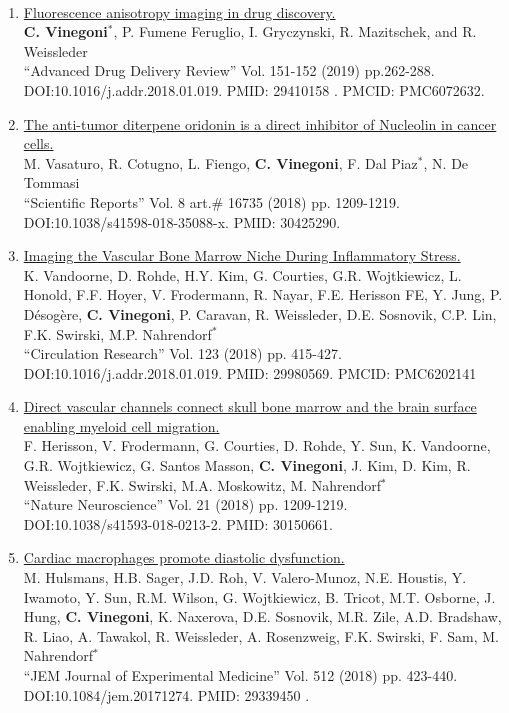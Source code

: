 \documentclass{resume}
\begin{document}
\begin{category}{~~}
\begin{enumerate}
\item \href{https://tinyurl.com/24h9yds6}{Fluorescence anisotropy imaging in drug discovery.}\\
 {\bf C. Vinegoni$^*$}, P. Fumene Feruglio, I. Gryczynski, R. Mazitschek, and R. Weissleder\\
``Advanced Drug Delivery Review''  Vol. 151-152 (2019) pp.262-288. \\DOI:10.1016/j.addr.2018.01.019. PMID: 29410158 . PMCID: PMC6072632.
\item 
\href{https://tinyurl.com/24c32k4p}{The anti-tumor diterpene oridonin is a direct inhibitor of Nucleolin in cancer cells.}\\
 M. Vasaturo, R. Cotugno, L. Fiengo, {\bf C. Vinegoni}, {F. Dal Piaz$^*$}, N. De Tommasi \\
``Scientific Reports''  Vol. 8 art.$\#$ 16735 (2018)
 pp. 1209-1219. \\DOI:10.1038/s41598-018-35088-x. PMID: 30425290.


\item
\href{https://tinyurl.com/xwey3azh}{Imaging the Vascular Bone Marrow Niche During Inflammatory Stress.}\\
K. Vandoorne, D. Rohde, H.Y. Kim, G. Courties, G.R. Wojtkiewicz, L. Honold, F.F. Hoyer, V. Frodermann, R. Nayar, F.E. Herisson FE, Y. Jung, P. Désogère, {\bf C. Vinegoni}, P. Caravan, R. Weissleder, D.E. Sosnovik, C.P. Lin, F.K. Swirski, M.P. Nahrendorf$^*$\\
``Circulation Research''  Vol. 123 (2018) pp. 415-427. \\DOI:10.1016/j.addr.2018.01.019. PMID: 29980569. PMCID: PMC6202141
 
\item
\href{https://tinyurl.com/kkk8uns}{Direct vascular channels connect skull bone marrow and the brain surface enabling myeloid cell migration.}\\
 F. Herisson, V. Frodermann, G. Courties, D. Rohde, Y. Sun, K. Vandoorne, G.R. Wojtkiewicz, G. Santos Masson, {\bf C. Vinegoni}, J. Kim, D. Kim, R. Weissleder, F.K. Swirski, M.A. Moskowitz, M. Nahrendorf$^*$\\
``Nature Neuroscience''  Vol. 21 (2018)
 pp. 1209-1219. \\DOI:10.1038/s41593-018-0213-2. PMID: 30150661.


\item
\href{https://tinyurl.com/274jupz9}{Cardiac macrophages promote diastolic dysfunction.}\\
M. Hulsmans, H.B. Sager, J.D. Roh, V. Valero-Munoz, N.E. Houstis, Y. Iwamoto, Y. Sun, R.M. Wilson, G. Wojtkiewicz, B. Tricot, M.T. Osborne, J. Hung, {\bf C. Vinegoni}, K. Naxerova, D.E. Sosnovik, M.R. Zile, A.D. Bradshaw, R. Liao, A. Tawakol, R. Weissleder, A. Rosenzweig, F.K. Swirski, F. Sam, { M. Nahrendorf$^*$}\\
``JEM Journal of Experimental Medicine''  Vol. 512 (2018) pp. 423-440. \\DOI:10.1084/jem.20171274. PMID: 29339450 .



\end{enumerate}
\end{category}
\end{document}
